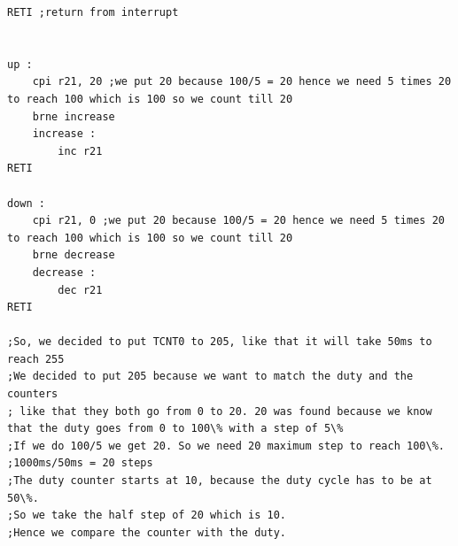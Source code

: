 \documentclass[a4paper,12pt]{article}
\begin{document}
\begin{lstlisting}
RETI ;return from interrupt


up :
	cpi r21, 20 ;we put 20 because 100/5 = 20 hence we need 5 times 20 to reach 100 which is 100 so we count till 20
	brne increase
	increase :
		inc r21
RETI

down :
	cpi r21, 0 ;we put 20 because 100/5 = 20 hence we need 5 times 20 to reach 100 which is 100 so we count till 20
	brne decrease
	decrease :
		dec r21
RETI

;So, we decided to put TCNT0 to 205, like that it will take 50ms to reach 255
;We decided to put 205 because we want to match the duty and the counters
; like that they both go from 0 to 20. 20 was found because we know that the duty goes from 0 to 100\% with a step of 5\%
;If we do 100/5 we get 20. So we need 20 maximum step to reach 100\%.
;1000ms/50ms = 20 steps
;The duty counter starts at 10, because the duty cycle has to be at 50\%.
;So we take the half step of 20 which is 10.
;Hence we compare the counter with the duty.

\end{lstlisting}
\end{document}
